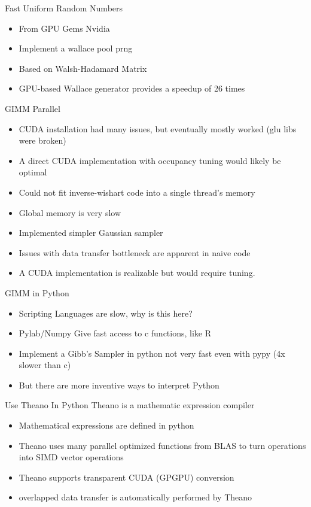\documentclass{beamer}
\begin{document}
\begin{frame}{Fast Uniform Random Numbers}

 \begin{itemize}
  \item From GPU Gems Nvidia
  \item Implement a wallace pool prng
  \item Based on Walsh-Hadamard Matrix
  \item GPU-based Wallace generator provides a speedup of 26 times
 \end{itemize}
\end{frame}
  
\begin{frame}{GIMM Parallel}
 \begin{itemize}
  \item CUDA installation had many issues, but eventually mostly worked (glu libs were broken)
  \item A direct CUDA implementation with occupancy tuning would likely be optimal
  \item Could not fit inverse-wishart code into a single thread's memory
  \item Global memory is very slow
  \item Implemented simpler Gaussian sampler
  \item Issues with data transfer bottleneck are apparent in naive code
  \item A CUDA implementation is realizable but would require tuning.
 \end{itemize}
\end{frame}

\begin{frame}{ GIMM in Python}
  \begin{itemize}
  \item Scripting Languages are slow, why is this here?
  \item Pylab/Numpy Give fast access to c functions, like R
  \item Implement a Gibb's Sampler in python not very fast even with pypy (4x slower than c)
  \item But there are more inventive ways to interpret Python
  \end{itemize}
\end{frame}

\begin{frame}{Use Theano In Python}
Theano is a mathematic expression compiler
 \begin{itemize}
  \item Mathematical expressions are defined in python
  \item Theano uses many parallel optimized functions from BLAS to turn operations into SIMD vector operations
  \item Theano supports transparent CUDA (GPGPU) conversion
  \item overlapped data transfer is automatically performed by Theano 
 \end{itemize}
\end{frame}
\end{document}
